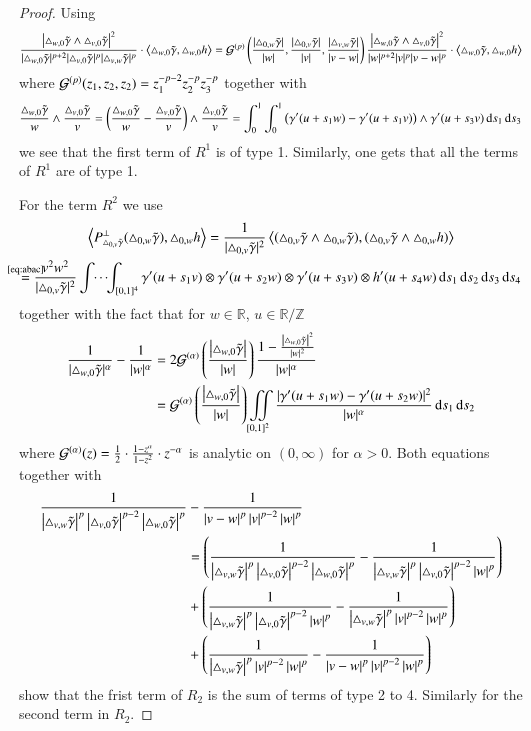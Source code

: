 \begin{proof}
 Using
 \begin{align*}
  \frac{\left|\T w0 \wedge \T v0 \right|^2}{|\T w0|^{p+2}|\T v0|^p |\T vw|^p}  \cdot  \sp{\T w0, \T[h] w0}
  = \G \left(\frac{|\T 0w|}{|w|}, \frac{|\T 0v|}{|v|}, \frac{|\T vw|}{|v-w|}\right)
 \frac{\left|\T w0 \wedge \T v0 \right|^2}{|w|^{p+2}|v|^p |v-w|^p}  \cdot  \sp{\T w0, \T[h] w0} 
 \end{align*}
 where
$
  \G (z_1, z_2, z_2) = z_1^{-p-2} z_2 ^{-p} z_3 ^{-p}
$
together with
 \begin{equation*}
  \frac {\T w0} w \wedge \frac {\T v0} v
  = \left(\frac {\T w0} w- \frac {\T v0} v \right)\wedge \frac {\T v0} v
  = \int_{0}^{1} \int_{0}^1 \left(\gamma'(u + s_1 w) - \gamma'(u+s_1 v) \right) \wedge \gamma'(u+s_3 v) \d s_1 \d s_3
 \end{equation*}
 we see that the first term of $R^1$ is of type 1. Similarly, one gets that all the terms of $R^1$ are
of type 1.


For the term $R^2$ we use
\begin{multline*}
 \sp{P^\bot_{\T 0v} (\T 0w), \T[h] 0w}
 =\frac 1 {|\T 0v|^2} \sp{(\T 0v \wedge \T 0w), (\T 0v \wedge \T[h] 0w)}  \\
 \refeq{abac} \frac {v^{2}w^{2}} {|\T 0v|^2} \idotsint_{[0,1]^4} \gamma'(u+s_1 v) \otimes \gamma'(u+s_2 w) \otimes \gamma'(u+s_3 v) \otimes 
 h'(u+s_4 w) \d s_1 \d s_2 \d s_3 \d s_4
\end{multline*}
together with the fact that for  $w \in \mathbb R$, $u \in \mathbb R / \mathbb  Z$
 \begin{equation} \label{eq:OHaraTypeTerm}
 \begin{split}
  \frac 1{|\T w0|^\alpha} - \frac 1 {|w|^\alpha} &= 2\G[\alpha]\br{\frac{\abs{\T w0}}{|w|}} \frac {1-\frac {\abs{\T w0}^2}{|w|^2}} {|w|^\alpha}\\
  &= \G[\alpha] \br{\frac{\abs{\T w0}}{|w|}} \iint\limits_{[0,1]^2} \frac {|\gamma'(u+s_1 w) - \gamma'(u+s_2 w)|^2}{|w|^\alpha} \d s_1 \d s_2
  \end{split}
  \end{equation}
 where $\G[\alpha] (z) = \tfrac12\cdot\frac {1-z^\alpha}{1-z^2} \cdot z^{-\alpha}$ is analytic on $(0,\infty)$ for $\alpha>0$.
 Both equations together with
\begin{align*}
 \frac 1{\abs{\T vw}^p\abs{\T v0}^{p-2}\abs{\T w0}^p} 
 &- \frac 1{\abs{v-w}^p\abs{v}^{p-2}\abs{w}^p}
\\ &= \left(\frac 1{\abs{\T vw}^p\abs{\T v0}^{p-2}\abs{\T w0}^p} 
 - \frac 1{\abs{\T vw}^p\abs{\T v0}^{p-2}\abs{w}^p} \right)
\\ &+ \left(\frac 1{\abs{\T vw}^p\abs{\T v0}^{p-2}\abs{w}^p} 
 - \frac 1{\abs{\T vw}^p\abs{v}^{p-2}\abs{w}^p} \right)
\\ &+ \left(\frac 1{\abs{\T vw}^p\abs{v}^{p-2}\abs{w}^p} 
 - \frac 1{\abs{v-w}^p\abs{v}^{p-2}\abs{w}^p} \right)
\end{align*}
show that the frist term of $R_2$ is the sum of terms of type 2 to 4. Similarly for the second term
in $R_2$.


\end{proof}
